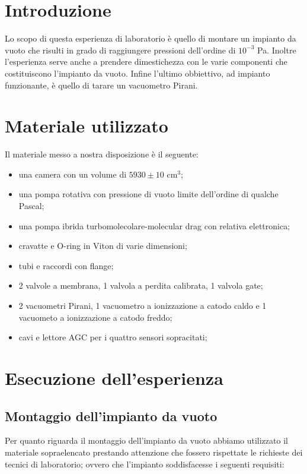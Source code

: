 \section{Introduzione}

Lo scopo di questa esperienza di laboratorio è quello di montare un impianto da vuoto che risulti in
grado di raggiungere pressioni dell'ordine di $10^{-3}$ \si{\pascal}. Inoltre l'esperienza serve anche a
prendere dimestichezza con le varie componenti che costituiscono l'impianto da vuoto.
Infine l'ultimo obbiettivo, ad impianto funzionante, è quello di tarare un vacuometro Pirani.

\section{Materiale utilizzato}

Il materiale messo a nostra disposizione è il seguente:

\begin{itemize}
	\item{una camera con un volume di $5930 \pm 10$ \si{\centi\metre}$^3$;}
	\item{una pompa rotativa con pressione di vuoto limite dell'ordine di qualche Pascal;}
	\item{una pompa ibrida turbomolecolare-molecular drag con relativa elettronica;}
	\item{cravatte e O-ring in Viton di varie dimensioni;}
	\item{tubi e raccordi con flange;}
	\item{2 valvole a membrana, 1 valvola a perdita calibrata, 1 valvola gate;}
	\item{2 vacuometri Pirani, 1 vacuometro a ionizzazione a catodo caldo e 1 vacuometo a ionizzazione a catodo freddo;}
	\item{cavi e lettore AGC per i quattro sensori sopracitati;}
\end{itemize}

\section{Esecuzione dell'esperienza}

\subsection{Montaggio dell'impianto da vuoto}

Per quanto riguarda il montaggio dell'impianto da vuoto abbiamo utilizzato il materiale sopraelencato
prestando attenzione che fossero rispettate le richieste dei tecnici di laboratorio;
ovvero che l'impianto soddisfacesse i seguenti requisiti:


